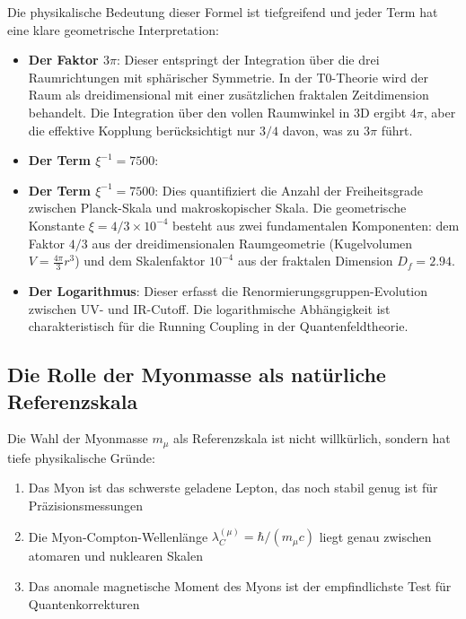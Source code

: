 \documentclass[12pt,a4paper]{article}
\theoremstyle{definition}
\begin{document}
	Die physikalische Bedeutung dieser Formel ist tiefgreifend und jeder Term hat eine klare geometrische Interpretation:
	
	\begin{itemize}
		\item \textbf{Der Faktor $3\pi$}: Dieser entspringt der Integration über die drei Raumrichtungen mit sphärischer Symmetrie. In der T0-Theorie wird der Raum als dreidimensional mit einer zusätzlichen fraktalen Zeitdimension behandelt. Die Integration über den vollen Raumwinkel in 3D ergibt $4\pi$, aber die effektive Kopplung berücksichtigt nur $3/4$ davon, was zu $3\pi$ führt.
		
		\item \textbf{Der Term $\xi^{-1} = 7500$}:\item \textbf{Der Term $\xi^{-1} = 7500$}: Dies quantifiziert die Anzahl der Freiheitsgrade zwischen Planck-Skala und makroskopischer Skala. Die geometrische Konstante $\xi = 4/3 \times 10^{-4}$ besteht aus zwei fundamentalen Komponenten: dem Faktor $4/3$ aus der dreidimensionalen Raumgeometrie (Kugelvolumen $V = \frac{4\pi}{3}r^3$) und dem Skalenfaktor $10^{-4}$ aus der fraktalen Dimension $D_f = 2.94$.
		
		\item \textbf{Der Logarithmus}: Dieser erfasst die Renormierungsgruppen-Evolution zwischen UV- und IR-Cutoff. Die logarithmische Abhängigkeit ist charakteristisch für die Running Coupling in der Quantenfeldtheorie.
	\end{itemize}
	
	\subsection{Die Rolle der Myonmasse als natürliche Referenzskala}
	
	Die Wahl der Myonmasse $m_{\mu}$ als Referenzskala ist nicht willkürlich, sondern hat tiefe physikalische Gründe:
	
	\begin{enumerate}
		\item Das Myon ist das schwerste geladene Lepton, das noch stabil genug ist für Präzisionsmessungen
		\item Die Myon-Compton-Wellenlänge $\lambda_C^{(\mu)} = \hbar/(m_\mu c)$ liegt genau zwischen atomaren und nuklearen Skalen
		\item Das anomale magnetische Moment des Myons ist der empfindlichste Test für Quantenkorrekturen
	\end{enumerate}
	
\end{document}
